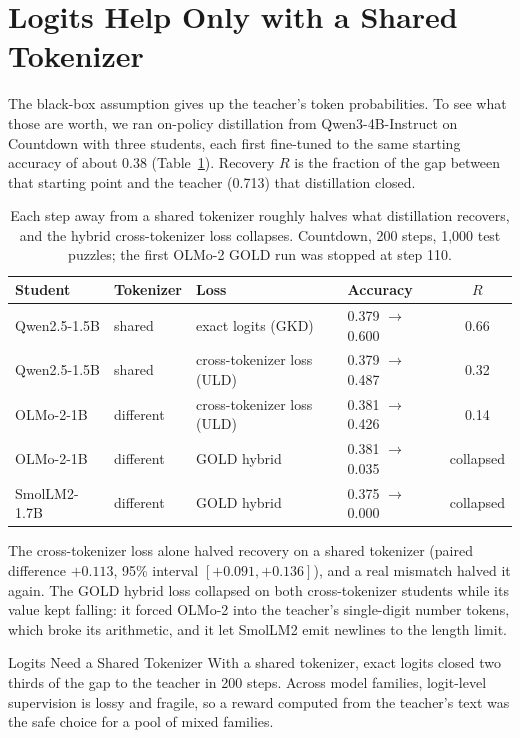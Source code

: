 \section{Logits Help Only with a Shared Tokenizer}
\label{pre:sec:motivating}

The black-box assumption gives up the teacher's token probabilities. To see what those are
worth, we ran on-policy distillation from Qwen3-4B-Instruct on Countdown with three
students, each first fine-tuned to the same starting accuracy of about 0.38
(Table~\ref{pre:tab:motivating}). Recovery $R$ is the fraction of the gap between that
starting point and the teacher (0.713) that distillation closed.

\begin{table}[htbp]
\centering
\small
\begin{tabular}{@{}llllc@{}}
\toprule
\textbf{Student} & \textbf{Tokenizer} & \textbf{Loss} & \textbf{Accuracy} & $R$ \\
\midrule
Qwen2.5-1.5B & shared    & exact logits (GKD)         & 0.379 $\to$ 0.600 & 0.66 \\
Qwen2.5-1.5B & shared    & cross-tokenizer loss (ULD) & 0.379 $\to$ 0.487 & 0.32 \\
OLMo-2-1B    & different & cross-tokenizer loss (ULD) & 0.381 $\to$ 0.426 & 0.14 \\
OLMo-2-1B    & different & GOLD hybrid                & 0.381 $\to$ 0.035 & collapsed \\
SmolLM2-1.7B & different & GOLD hybrid                & 0.375 $\to$ 0.000 & collapsed \\
\bottomrule
\end{tabular}
\caption{Each step away from a shared tokenizer roughly halves what distillation recovers,
and the hybrid cross-tokenizer loss collapses. Countdown, 200 steps, 1,000 test puzzles;
the first OLMo-2 GOLD run was stopped at step 110.}
\label{pre:tab:motivating}
\end{table}

The cross-tokenizer loss alone halved recovery on a shared tokenizer (paired difference
$+0.113$, 95\% interval $[+0.091, +0.136]$), and a real mismatch halved it again. The GOLD
hybrid loss collapsed on both cross-tokenizer students while its value kept falling: it
forced OLMo-2 into the teacher's single-digit number tokens, which broke its arithmetic, and
it let SmolLM2 emit newlines to the length limit.

\begin{takeaway}{Logits Need a Shared Tokenizer}
\label{pre:tk:blackbox}
With a shared tokenizer, exact logits closed two thirds of the gap to the teacher in 200
steps. Across model families, logit-level supervision is lossy and fragile, so a reward
computed from the teacher's text was the safe choice for a pool of mixed families.
\end{takeaway}

